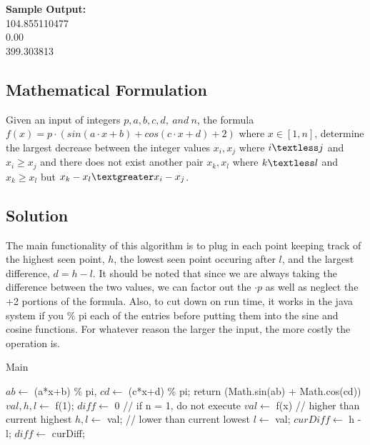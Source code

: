\documentclass[12pt]{article}
\begin{document}
\noindent \textbf{Sample Output:} \\
104.855110477  \\
0.00           \\
399.303813


\newpage

\subsection{Mathematical Formulation}
Given an input of integers $p, a, b, c, d,\ and\ n$, the formula
$f(x) = p\cdot (sin(a\cdot x + b) + cos(c\cdot x + d) + 2)$ where $x \in [1, n]$, determine the largest
decrease between the integer values $x_i, x_j$ where $i \textless j$ and $x_i \geq x_j$ and there does
not exist another pair $x_k, x_l$ where $k \textless l$ and $x_k \geq x_l$ but $x_k - x_l \textgreater x_i - x_j$.


\subsection{Solution}
The main functionality of this algorithm is to plug in each point keeping track of the highest seen point, $h$,
the lowest seen point occuring after $l$, and the largest difference, $d = h-l$. It should be noted that since
we are always taking the difference between the two values, we can factor out the $\cdot p$ as well as neglect
the +2 portions of the formula. Also, to cut down on run time, it works in the java system if you \% pi each of
the entries before putting them into the sine and cosine functions. For whatever reason the larger the input,
the more costly the operation is.

\begin{algorithm}[H]
\caption{Main}
\begin{algorithmic}
        \State $ab \gets$ (a*x+b) \% pi,
        \State $cd \gets$ (c*x+d) \% pi;
        \State return (Math.sin(ab) + Math.cos(cd))
    \EndProcedure
        \State $val, h, l \gets$ f(1); $diff \gets$ 0
         // if n = 1, do not execute
            \State $val \gets$ f(x)
             // higher than current highest
                \State $h, l \gets$ val;
             // lower than current lowest
                \State $l \gets$ val; $curDiff \gets$ h - l;
                    $diff \gets$ curDiff;
                \EndIf
            \EndIf
        \EndFor
        \State {}
    \EndProcedure
\end{algorithmic}
\end{algorithm}
\end{document}
